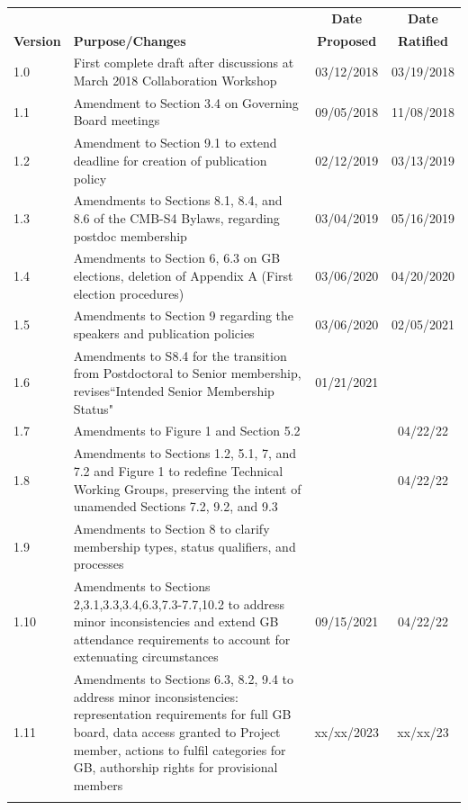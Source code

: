 \documentclass[12pt]{article}
\begin{document}
\begin{table}[ht!]
\begin{center}
\begin{tabular}{| l | p{3.7in} | c | c |}
\hline
&  & {\bf Date} & {\bf Date}  \\
{\bf Version}  &  \hspace{1.0in} {\bf Purpose/Changes} & {\bf Proposed} & {\bf Ratified} \\
\hline\hline
1.0 & First complete draft after discussions at March 2018 Collaboration Workshop & 03/12/2018 & 03/19/2018 \\ \hline
1.1 & Amendment to Section 3.4 on Governing Board meetings & 09/05/2018 & 11/08/2018 \\ \hline
1.2 & Amendment to Section 9.1 to extend deadline for creation of publication policy & 02/12/2019 & 03/13/2019\\  \hline 
1.3 & Amendments to Sections 8.1, 8.4, and 8.6 of the CMB-S4 Bylaws, regarding postdoc membership & 03/04/2019 & 05/16/2019 \\ \hline
1.4 & Amendments to Section 6, 6.3 on GB elections, deletion of Appendix A (First election procedures) & 03/06/2020 & 04/20/2020 \\ \hline
1.5 & Amendments to Section 9 regarding the speakers and publication policies & 03/06/2020 & 02/05/2021 \\ \hline
1.6 & Amendments to S8.4 for the transition from Postdoctoral to Senior membership, revises``Intended Senior Membership Status" & 01/21/2021 & \\ \hline
1.7 & Amendments to Figure 1 and Section 5.2 & & 04/22/22 \\ \hline
1.8 & Amendments to Sections 1.2, 5.1, 7, and 7.2 and Figure 1 to redefine Technical Working Groups, preserving the intent of unamended Sections 7.2, 9.2, and 9.3 &  & 04/22/22\\ \hline
1.9 & Amendments to Section 8 to clarify membership types, status qualifiers, and processes & & \\ \hline
1.10 & Amendments to Sections 2,3.1,3.3,3.4,6.3,7.3-7.7,10.2 to address minor inconsistencies and extend GB attendance requirements to account for extenuating circumstances & 09/15/2021 & 04/22/22 \\ \hline
1.11 & Amendments to Sections 6.3, 8.2, 9.4 to address minor inconsistencies: representation requirements for full GB board, data access granted to Project member, actions to fulfil categories for GB, authorship rights for provisional members & xx/xx/2023 & xx/xx/23 \\ \hline
& & &\\ \hline
\end{tabular}
\end{center}
\label{tab:version}
\end{table}
\end{document}

